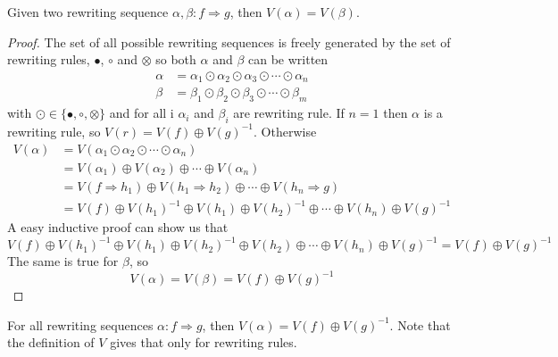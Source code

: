 \documentclass[a4paper]{article}
\begin{document}
\begin{proposition}
  Given two rewriting sequence $\alpha, \beta: f \Rightarrow g$, then $V(\alpha)
    = V(\beta)$.
  
  \begin{proof}
    The set of all possible rewriting sequences is freely generated by the set
      of rewriting rules, $\bullet$, $\circ$ and $\otimes$ so both $\alpha$ and
      $\beta$ can be written
    \begin{align}
      \alpha &= \alpha_1 \odot \alpha_2 \odot \alpha_3 \odot \cdots \odot
        \alpha_n \\
      \beta &= \beta_1 \odot \beta_2 \odot \beta_3 \odot \cdots \odot \beta_m
    \end{align}
    with $\odot \in \{\bullet, \circ, \otimes\}$ and for all i $\alpha_i$ and
      $\beta_i$ are rewriting rule.
    If $n = 1$ then $\alpha$ is a rewriting rule, so $V(r) = V(f) \oplus
      V(g)^{-1}$.
    Otherwise
    \begin{align}
      V(\alpha) &= V(\alpha_1 \odot \alpha_2 \odot \cdots \odot \alpha_n) \\
      &= V(\alpha_1) \oplus V(\alpha_2) \oplus \cdots \oplus V(\alpha_n) \\
      &= V(f \Rightarrow h_1) \oplus V(h_1 \Rightarrow h_2) \oplus \cdots \oplus
        V(h_n \Rightarrow g) \\
      &= V(f) \oplus V(h_1)^{-1} \oplus V(h_1) \oplus V(h_2)^{-1} \oplus \cdots
        \oplus V(h_n) \oplus V(g)^{-1}
    \end{align}
    A easy inductive proof can show us that
    \[
      V(f) \oplus V(h_1)^{-1} \oplus V(h_1) \oplus V(h_2)^{-1} \oplus V(h_2)
        \oplus \cdots \oplus V(h_n) \oplus V(g)^{-1} = V(f) \oplus V(g)^{-1}
    \]
    The same is true for $\beta$, so
    \[
      V(\alpha) = V(\beta) = V(f) \oplus V(g)^{-1}
    \]
  \end{proof}
\end{proposition}

\begin{corollary}
  For all rewriting sequences $\alpha: f \Rightarrow g$, then $V(\alpha) = V(f)
    \oplus V(g)^{-1}$.
  Note that the definition of $V$ gives that only for rewriting rules.
\end{corollary}
\end{document}
